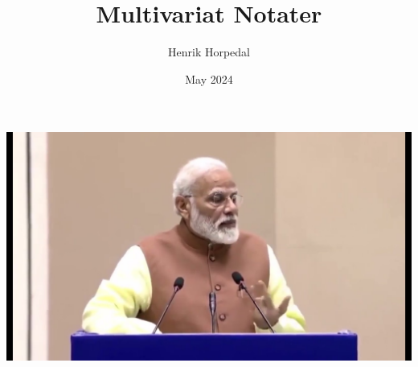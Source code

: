 \documentclass{article}
\title{Multivariat Notater}
\author{Henrik Horpedal}
\date{May 2024}
\begin{document}
\begin{titlepage}
    \maketitle
    \begin{center}
        \includegraphics[width=1\textwidth]{maxresdefault.jpg}
    \end{center}
\end{titlepage}


\tableofcontents %


\end{document}
